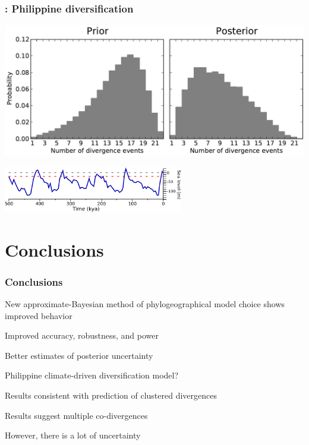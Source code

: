 \begin{frame}
    \frametitle{\dppmsbayes: Philippine diversification}
    \centerline{
    \includegraphics[width=\textwidth]{../../empirical-analyses/plots/philippines-dpp-psi-posterior-prior.pdf}}
    \smallskip
    \centerline{
    \includegraphics[height=2cm]{../images/sea-level-only.pdf}}
\end{frame}

\section{Conclusions}

\begin{frame}
    \frametitle{Conclusions}
    \begin{myitemize}
        \item<1-> New approximate-Bayesian method of phylogeographical
            model choice shows improved behavior
            \begin{myitemize}
                \item<1-> Improved accuracy, robustness, and power
                \item<1-> Better estimates of posterior
                    uncertainty
            \end{myitemize}
        \smallskip
        \item<2-> Philippine climate-driven diversification model?
            \begin{myitemize}
                \item<2-> Results consistent with prediction of clustered
                    divergences
                \item<2-> Results suggest multiple co-divergences
                \item<2-> However, there is a lot of uncertainty
            \end{myitemize}
    \end{myitemize}
\end{frame}


